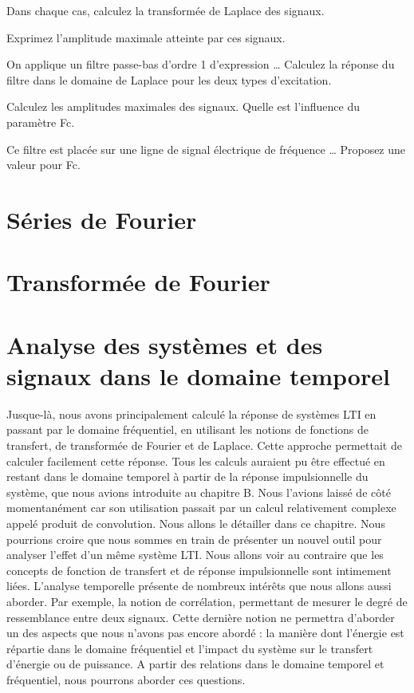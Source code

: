 \documentclass[]{report}
\begin{document}
	Dans chaque cas, calculez la transformée de Laplace des signaux.
	
	Exprimez l'amplitude maximale atteinte par ces signaux.
	
	On applique un filtre passe-bas d'ordre 1 d'expression … Calculez la réponse du filtre dans le domaine de Laplace pour les deux types d'excitation.
	
	Calculez les amplitudes maximales des signaux. Quelle est l'influence du paramètre Fc.
	
	Ce filtre est placée sur une ligne de signal électrique de fréquence … Proposez une valeur pour Fc.
	
	\newpage
	
\chapter{Séries de Fourier}


	\newpage
	
\chapter{Transformée de Fourier}

	\newpage
	
\chapter{Analyse des systèmes et des signaux dans le domaine temporel}
	
	Jusque-là, nous avons principalement calculé la réponse de systèmes LTI en passant par le domaine fréquentiel, en utilisant les notions de fonctions de transfert, de transformée de Fourier et de Laplace. Cette approche permettait de calculer facilement cette réponse.
	Tous les calculs auraient pu être effectué en restant dans le domaine temporel à partir de la réponse impulsionnelle du système, que nous avions introduite au chapitre B. Nous l'avions laissé de côté momentanément car son utilisation passait par un calcul relativement complexe appelé produit de convolution. Nous allons le détailler dans ce chapitre.
	Nous pourrions croire que nous sommes en train de présenter un nouvel outil pour analyser l'effet d'un même système LTI. Nous allons voir au contraire que les concepts de fonction de transfert et de réponse impulsionnelle sont intimement liées.
	L'analyse temporelle présente de nombreux intérêts que nous allons aussi aborder. Par exemple, la notion de corrélation, permettant de mesurer le degré de ressemblance entre deux signaux. Cette dernière notion ne permettra d'aborder un des aspects que nous n'avons pas encore abordé : la manière dont l'énergie est répartie dans le domaine fréquentiel et l'impact du système sur le transfert d'énergie ou de puissance. A partir des relations dans le domaine temporel et fréquentiel, nous pourrons aborder ces questions.
	
\end{document}
